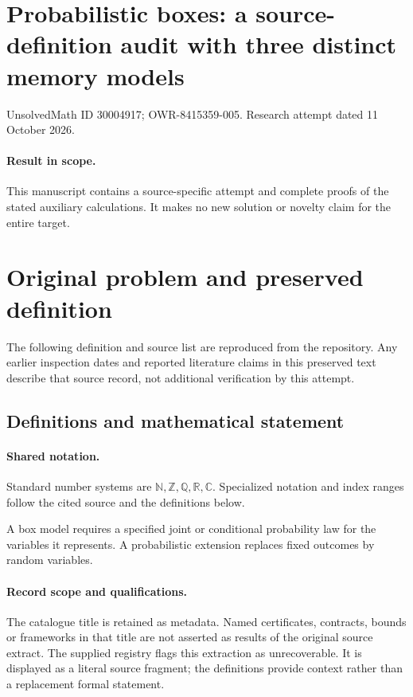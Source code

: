 \documentclass[11pt]{article}
\begin{document}
\section*{Probabilistic boxes: a source-definition audit with three distinct memory models}
\noindent UnsolvedMath ID 30004917; OWR-8415359-005. Research attempt dated 11 October 2026.
\paragraph{Result in scope.}This manuscript contains a source-specific attempt and complete proofs of the stated auxiliary calculations. It makes no new solution or novelty claim for the entire target.
\section{Original problem and preserved definition}
The following definition and source list are reproduced from the repository. Any earlier inspection dates and reported literature claims in this preserved text describe that source record, not additional verification by this attempt.
\subsection{Definitions and mathematical statement}

\paragraph{Shared notation.}Standard number systems are $\mathbb N,\mathbb Z,\mathbb Q,\mathbb R,\mathbb C$. Specialized notation and index ranges follow the cited source and the definitions below.


A box model requires a specified joint or conditional probability law for the variables it represents. A probabilistic extension replaces fixed outcomes by random variables.
\paragraph{Record scope and qualifications.}
The catalogue title is retained as metadata. Named certificates, contracts, bounds or frameworks in that title are not asserted as results of the original source extract.
The supplied registry flags this extraction as unrecoverable. It is displayed as a literal source fragment; the definitions provide context rather than a replacement formal statement.
\end{document}
